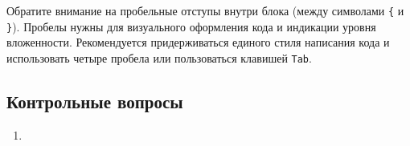 \documentclass[myc.tex]{subfiles}
\begin{document}


Обратите внимание на пробельные отступы внутри блока (между символами \texttt{\{} и \texttt{\}}). Пробелы нужны для визуального оформления кода и индикации уровня вложенности. Рекомендуется придерживаться единого стиля написания кода и использовать четыре пробела или пользоваться клавишей \texttt{Tab}.



















\vfill
\subsection*{Контрольные вопросы}
\begin{enumerate}
\item 
\end{enumerate}
\end{document}
